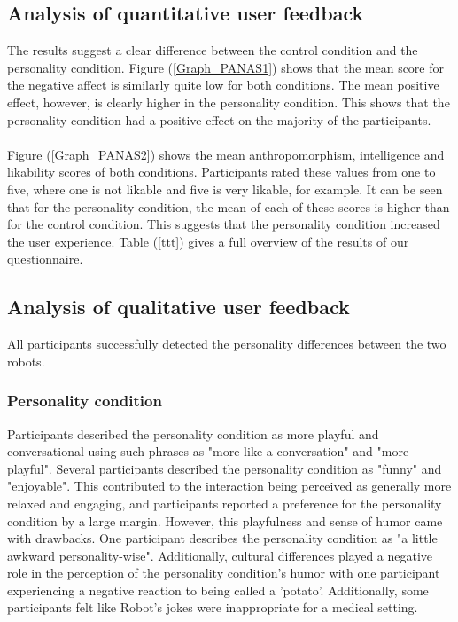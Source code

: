 \documentclass[runningheads]{llncs}
\begin{document}
\subsection{\textbf{Analysis of quantitative user feedback}}

The results suggest a clear difference between the control condition and the personality condition. Figure (\ref{Graph_PANAS1}) shows that the mean score for the negative affect is similarly quite low for both conditions. The mean positive effect, however, is clearly higher in the personality condition. This shows that the personality condition had a positive effect on the majority of the participants.
\\\\
Figure (\ref{Graph_PANAS2}) shows the mean anthropomorphism, intelligence and likability scores of both conditions. Participants rated these values from one to five, where one is not likable and five is very likable, for example. It can be seen that for the personality condition, the mean of each of these scores is higher than for the control condition. This suggests that the personality condition increased the user experience. Table (\ref{ttt}) gives a full overview of the results of our questionnaire. 


\subsection{\textbf{Analysis of qualitative user feedback}}

All participants successfully detected the personality differences between the two robots. 

\subsubsection*{Personality condition}
Participants described the personality condition as more playful and conversational using such phrases as "more like a conversation" and "more playful". Several participants described the personality condition as "funny" and "enjoyable". This contributed to the interaction being perceived as generally more relaxed and engaging, and participants reported a preference for the personality condition by a large margin. However, this playfulness and sense of humor came with drawbacks. One participant describes the personality condition as "a little awkward personality-wise". Additionally, cultural differences played a negative role in the perception of the personality condition's humor with one participant experiencing a negative reaction to being called a 'potato'. Additionally, some participants felt like Robot's jokes were inappropriate for a medical setting.
\end{document}
